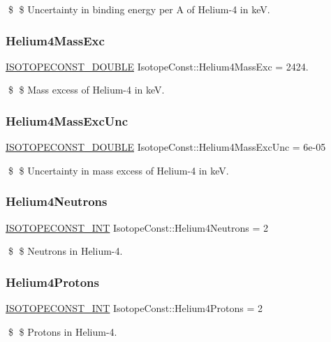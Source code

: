 \$ \$ Uncertainty in binding energy per A of Helium-\/4 in keV. \mbox{\label{group___isotope_const-_helium-_he4_gac9eb60ba4c3e14577336a04d7b0061c7}} 
\subsubsection{\texorpdfstring{Helium4\+Mass\+Exc}{Helium4MassExc}}
{\footnotesize\ttfamily \mbox{\hyperlink{group___isotope_const-_macros_ga8f45a7272ce02c0b4c65c44636ed719a}{I\+S\+O\+T\+O\+P\+E\+C\+O\+N\+S\+T\+\_\+\+D\+O\+U\+B\+LE}} Isotope\+Const\+::\+Helium4\+Mass\+Exc = 2424.}

\$ \$ Mass excess of Helium-\/4 in keV. \mbox{\label{group___isotope_const-_helium-_he4_ga459fd7bd689b5ac6b1c115b3844b88cb}} 
\subsubsection{\texorpdfstring{Helium4\+Mass\+Exc\+Unc}{Helium4MassExcUnc}}
{\footnotesize\ttfamily \mbox{\hyperlink{group___isotope_const-_macros_ga8f45a7272ce02c0b4c65c44636ed719a}{I\+S\+O\+T\+O\+P\+E\+C\+O\+N\+S\+T\+\_\+\+D\+O\+U\+B\+LE}} Isotope\+Const\+::\+Helium4\+Mass\+Exc\+Unc = 6e-\/05}

\$ \$ Uncertainty in mass excess of Helium-\/4 in keV. \mbox{\label{group___isotope_const-_helium-_he4_ga3d7d61d527d6507cfa25400872d7c33b}} 
\subsubsection{\texorpdfstring{Helium4\+Neutrons}{Helium4Neutrons}}
{\footnotesize\ttfamily \mbox{\hyperlink{group___isotope_const-_macros_ga5f18360b3e99483a35c32d789e62621c}{I\+S\+O\+T\+O\+P\+E\+C\+O\+N\+S\+T\+\_\+\+I\+NT}} Isotope\+Const\+::\+Helium4\+Neutrons = 2}

\$ \$ Neutrons in Helium-\/4. \mbox{\label{group___isotope_const-_helium-_he4_gaa858d2d34272e97582deb4432666a209}} 
\subsubsection{\texorpdfstring{Helium4\+Protons}{Helium4Protons}}
{\footnotesize\ttfamily \mbox{\hyperlink{group___isotope_const-_macros_ga5f18360b3e99483a35c32d789e62621c}{I\+S\+O\+T\+O\+P\+E\+C\+O\+N\+S\+T\+\_\+\+I\+NT}} Isotope\+Const\+::\+Helium4\+Protons = 2}

\$ \$ Protons in Helium-\/4. 
